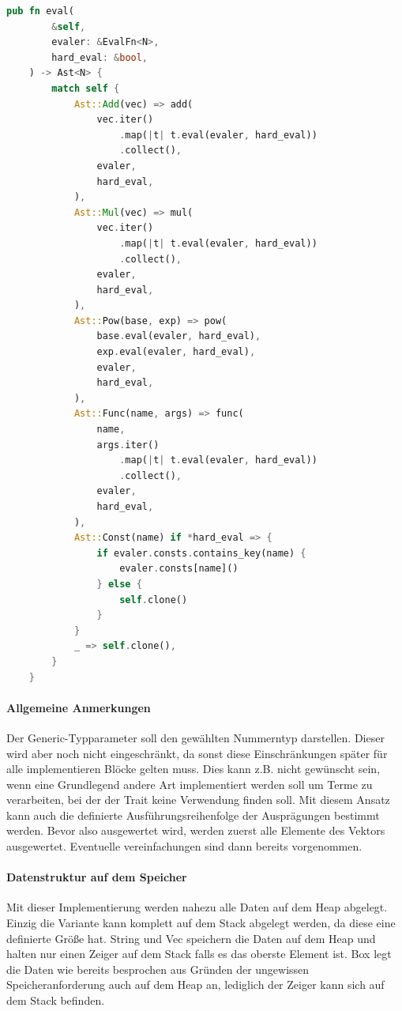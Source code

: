 \documentclass[11pt,a4paper, ngerman]{article}
\begin{document}
\begin{lstlisting}[language=rust, caption={eval-Methode 1. Implementierung}]
pub fn eval(
        &self,
        evaler: &EvalFn<N>,
        hard_eval: &bool,
    ) -> Ast<N> {
        match self {
            Ast::Add(vec) => add(
                vec.iter()
                    .map(|t| t.eval(evaler, hard_eval))
                    .collect(),
                evaler,
                hard_eval,
            ),
            Ast::Mul(vec) => mul(
                vec.iter()
                    .map(|t| t.eval(evaler, hard_eval))
                    .collect(),
                evaler,
                hard_eval,
            ),
            Ast::Pow(base, exp) => pow(
                base.eval(evaler, hard_eval),
                exp.eval(evaler, hard_eval),
                evaler,
                hard_eval,
            ),
            Ast::Func(name, args) => func(
                name,
                args.iter()
                    .map(|t| t.eval(evaler, hard_eval))
                    .collect(),
                evaler,
                hard_eval,
            ),
            Ast::Const(name) if *hard_eval => {
                if evaler.consts.contains_key(name) {
                    evaler.consts[name]()
                } else {
                    self.clone()
                }
            }
            _ => self.clone(),
        }
    }
\end{lstlisting}

\paragraph{Allgemeine Anmerkungen} Der Generic-Typparameter  soll den gewählten Nummerntyp darstellen. Dieser wird aber noch nicht eingeschränkt, da sonst diese Einschränkungen später für alle implementieren Blöcke gelten muss. Dies kann z.B. nicht gewünscht sein, wenn eine Grundlegend andere Art implementiert werden soll um Terme zu verarbeiten, bei der der Trait  keine Verwendung finden soll. Mit diesem Ansatz kann auch die definierte Ausführungsreihenfolge der Ausprägungen bestimmt werden. Bevor also  ausgewertet wird, werden zuerst alle Elemente des Vektors ausgewertet. Eventuelle vereinfachungen sind dann bereits vorgenommen.

\paragraph{Datenstruktur auf dem Speicher} Mit dieser Implementierung werden nahezu alle Daten auf dem Heap abgelegt. Einzig die Variante  kann komplett auf dem Stack abgelegt werden, da diese eine definierte Größe hat. String und Vec speichern die Daten auf dem Heap und halten nur einen Zeiger auf dem Stack falls es das oberste Element ist. Box legt die Daten wie bereits besprochen aus Gründen der ungewissen Speicheranforderung auch auf dem Heap an, lediglich der Zeiger kann sich auf dem Stack befinden.
\end{document}
